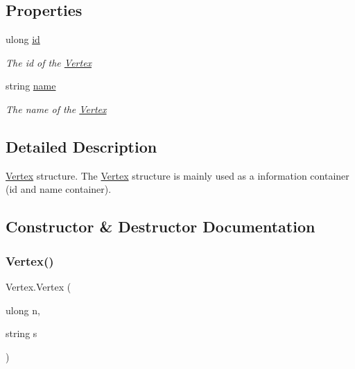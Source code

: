 \subsection*{Properties}
\begin{DoxyCompactItemize}
\item 
ulong \hyperlink{structVertex_a586a5027b186f95b77920c765d867aea}{id}
\begin{DoxyCompactList}\small\item\em The id of the \hyperlink{structVertex}{Vertex}\end{DoxyCompactList}\item 
string \hyperlink{structVertex_a564e63a0293b07f4ec0d559f7d40cf72}{name}
\begin{DoxyCompactList}\small\item\em The name of the \hyperlink{structVertex}{Vertex}\end{DoxyCompactList}\end{DoxyCompactItemize}


\subsection{Detailed Description}
\hyperlink{structVertex}{Vertex} structure. The \hyperlink{structVertex}{Vertex} structure is mainly used as a information container (id and name container). 



\subsection{Constructor \& Destructor Documentation}
\mbox{\label{structVertex_a0619e8b3a0e56203444bbc688e4882d7}} 
\subsubsection{\texorpdfstring{Vertex()}{Vertex()}\hspace{0.1cm}{\footnotesize\ttfamily [1/3]}}
{\footnotesize\ttfamily Vertex.\+Vertex (\begin{DoxyParamCaption}\item[{ulong}]{n,  }\item[{string}]{s }\end{DoxyParamCaption})\hspace{0.3cm}{\ttfamily [inline]}}



